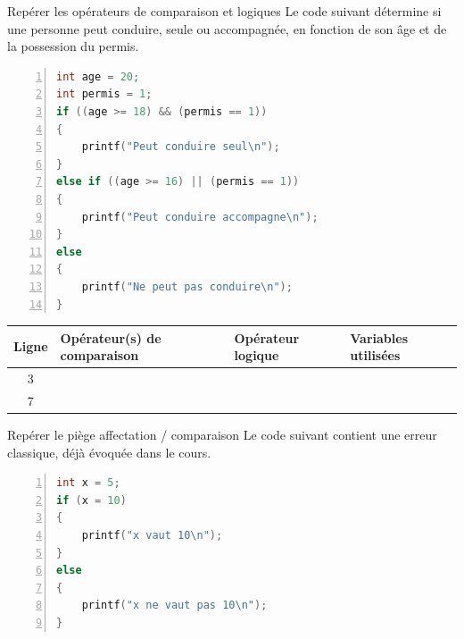 \begin{UPSTIexercice}{Repérer les opérateurs de comparaison et logiques}
	Le code suivant détermine si une personne peut conduire, seule ou accompagnée, en fonction de son âge et de la possession du permis.

	\begin{lstlisting}[language=c, numbers=left]
int age = 20;
int permis = 1;
if ((age >= 18) && (permis == 1))
{
    printf("Peut conduire seul\n");
}
else if ((age >= 16) || (permis == 1))
{
    printf("Peut conduire accompagne\n");
}
else
{
    printf("Ne peut pas conduire\n");
}
	\end{lstlisting}


	\begin{center}
		\begin{tabular}{|c|l|l|l|}
			\hline
			Ligne & Opérateur(s) de comparaison & Opérateur logique & Variables utilisées \\
			\hline
			3     &                             &                    &                      \\
			\hline
			7     &                             &                    &                      \\
			\hline
		\end{tabular}
	\end{center}
\end{UPSTIexercice}

\begin{UPSTIexercice}{Repérer le piège affectation / comparaison}
	Le code suivant contient une erreur classique, déjà évoquée dans le cours.

	\begin{lstlisting}[language=c, numbers=left]
int x = 5;
if (x = 10)
{
    printf("x vaut 10\n");
}
else
{
    printf("x ne vaut pas 10\n");
}
	\end{lstlisting}

\end{UPSTIexercice}

